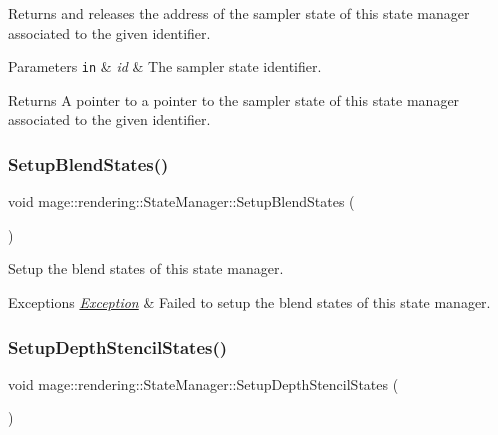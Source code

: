 Returns and releases the address of the sampler state of this state manager associated to the given identifier.


\begin{DoxyParams}[1]{Parameters}
\mbox{\tt in}  & {\em id} & The sampler state identifier. \\
\hline
\end{DoxyParams}
\begin{DoxyReturn}{Returns}
A pointer to a pointer to the sampler state of this state manager associated to the given identifier. 
\end{DoxyReturn}
\hypertarget{classmage_1_1rendering_1_1_state_manager_a358133f8e2d012ddde64083e83650914}{}\label{classmage_1_1rendering_1_1_state_manager_a358133f8e2d012ddde64083e83650914} 
\subsubsection{\texorpdfstring{Setup\+Blend\+States()}{SetupBlendStates()}}
{\footnotesize\ttfamily void mage\+::rendering\+::\+State\+Manager\+::\+Setup\+Blend\+States (\begin{DoxyParamCaption}{ }\end{DoxyParamCaption})\hspace{0.3cm}{\ttfamily [private]}}

Setup the blend states of this state manager.


\begin{DoxyExceptions}{Exceptions}
{\em \hyperlink{classmage_1_1_exception}{Exception}} & Failed to setup the blend states of this state manager. \\
\hline
\end{DoxyExceptions}
\hypertarget{classmage_1_1rendering_1_1_state_manager_ae77e458a375e8cb2540eeb0230cb047b}{}\label{classmage_1_1rendering_1_1_state_manager_ae77e458a375e8cb2540eeb0230cb047b} 
\subsubsection{\texorpdfstring{Setup\+Depth\+Stencil\+States()}{SetupDepthStencilStates()}}
{\footnotesize\ttfamily void mage\+::rendering\+::\+State\+Manager\+::\+Setup\+Depth\+Stencil\+States (\begin{DoxyParamCaption}{ }\end{DoxyParamCaption})\hspace{0.3cm}{\ttfamily [private]}}

